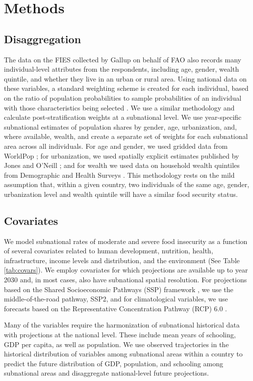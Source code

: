 \documentclass[titlepage]{article}
\begin{document}
\section{Methods}
\subsection{Disaggregation}
The data on the FIES collected by Gallup on behalf of FAO also records many individual-level attributes from the respondents, including age, gender, wealth quintile, and whether they live in an urban or rural area.  Using national data on these variables, a standard weighting scheme is created for each individual, based on the ratio of population probabilities to sample probabilities of an individual with those characteristics being selected \citep{bethlehem2009applied}.  We use a similar methodology and calculate post-stratification weights at a subnational level.  We use year-specific subnational estimates of population shares by gender, age, urbanization, and, where available, wealth, and create a separate set of weights for each subnational area across all individuals.  For age and gender, we used gridded data from WorldPop \citep{Tatem2017}; for urbanization, we used spatially explicit estimates published by Jones and O'Neill \citep{Jones2016}; and for wealth we used data on household wealth quintiles from Demographic and Health Surveys \citep{dhsall}.  This methodology rests on the mild assumption that, within a given country, two individuals of the same age, gender, urbanization level and wealth quintile will have a similar food security status.

\subsection{Covariates}
We model subnational rates of moderate and severe food insecurity as a function of several covariates related to human development, nutrition, health, infrastructure, income levels and distribution, and the environment (See Table \ref{tab:covars}).  We employ covariates for which projections are available up to year 2030 and, in most cases, also have subnational spatial resolution.  For projections based on the Shared Socioeconomic Pathways (SSP) framework \citep{oneill2014new}, we use the middle-of-the-road pathway, SSP2, and for climatological variables, we use forecasts based on the Representative Concentration Pathway (RCP) 6.0 \citep{van2011representative}.  

Many of the variables require the harmonization of subnational historical data with projections at the national level.  These include mean years of schooling, GDP per capita, as well as population. We use observed trajectories in the historical distribution of variables among subnational areas within a country to predict the future distribution of GDP, population, and schooling among subnational areas and disaggregate national-level future projections.
\end{document}

